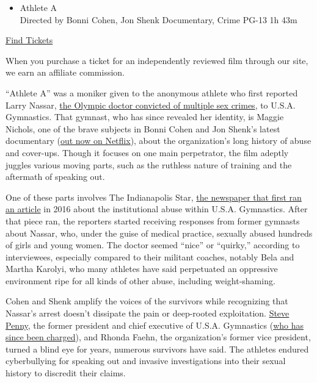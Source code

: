 \begin{itemize}
\tightlist
\item
  Athlete A\\
  Directed by Bonni Cohen, Jon Shenk Documentary, Crime PG-13 1h 43m
\end{itemize}

\href{https://www.imdb.com/showtimes/title/tt11905462?ref_=ref_ext_NYT}{Find
Tickets}

When you purchase a ticket for an independently reviewed film through
our site, we earn an affiliate commission.

``Athlete A'' was a moniker given to the anonymous athlete who first
reported Larry Nassar,
\href{https://www.nytimes.com/2018/01/25/sports/larry-nassar-gymnastics-abuse.html}{the
Olympic doctor convicted of multiple sex crimes}, to U.S.A. Gymnastics.
That gymnast, who has since revealed her identity, is Maggie Nichols,
one of the brave subjects in Bonni Cohen and Jon Shenk's latest
documentary (\href{https://www.netflix.com/title/81034185}{out now on
Netflix}), about the organization's long history of abuse and cover-ups.
Though it focuses on one main perpetrator, the film adeptly juggles
various moving parts, such as the ruthless nature of training and the
aftermath of speaking out.

One of these parts involves The Indianapolis Star,
\href{https://www.indystar.com/story/news/investigations/2016/08/04/usa-gymnastics-sex-abuse-protected-coaches/85829732/}{the
newspaper that first ran an article} in 2016 about the institutional
abuse within U.S.A. Gymnastics. After that piece ran, the reporters
started receiving responses from former gymnasts about Nassar, who,
under the guise of medical practice, sexually abused hundreds of girls
and young women. The doctor seemed ``nice'' or ``quirky,'' according to
interviewees, especially compared to their militant coaches, notably
Bela and Martha Karolyi, who many athletes have said perpetuated an
oppressive environment ripe for all kinds of other abuse, including
weight-shaming.

Cohen and Shenk amplify the voices of the survivors while recognizing
that Nassar's arrest doesn't dissipate the pain or deep-rooted
exploitation.
\href{https://www.nytimes.com/2018/10/18/sports/steve-penny-gymnastics-arrest-tampering.html}{Steve
Penny}, the former president and chief executive of U.S.A. Gymnastics
(\href{https://www.nytimes.com/2018/10/18/sports/steve-penny-usa-gymnastics-fbi.html}{who
has since been charged}), and Rhonda Faehn, the organization's former
vice president, turned a blind eye for years, numerous survivors have
said. The athletes endured cyberbullying for speaking out and invasive
investigations into their sexual history to discredit their claims.

